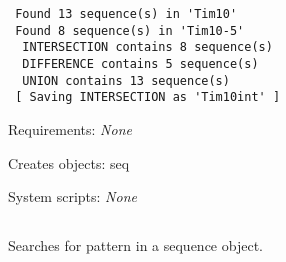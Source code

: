 \begin{description}
\begin{enumerate}
\begin{verbatim}
 Found 13 sequence(s) in 'Tim10'
 Found 8 sequence(s) in 'Tim10-5'
  INTERSECTION contains 8 sequence(s)
  DIFFERENCE contains 5 sequence(s)
  UNION contains 13 sequence(s)
 [ Saving INTERSECTION as 'Tim10int' ]

\end{verbatim}

\end{enumerate}


\item{Requirements:} {\em None}


\item{Creates objects:} seq


\item{System scripts:} {\em None}

\end{description}




\subsection[seq\_pattern]{  }



Searches for pattern in a sequence object.



